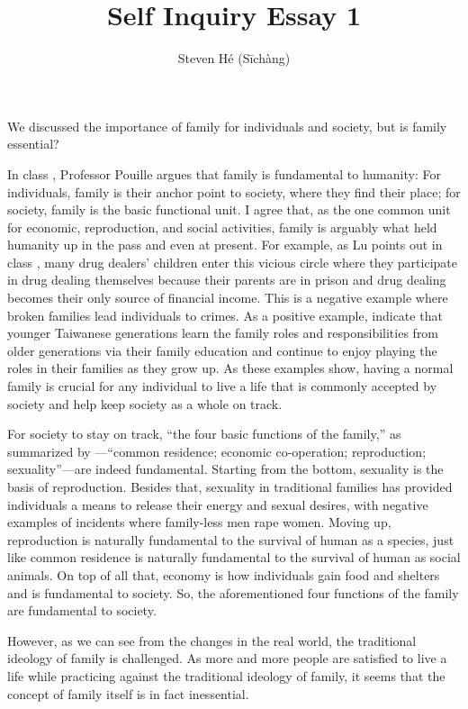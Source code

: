 \documentclass[12pt]{article}
\title{Self Inquiry Essay 1}
\author{Steven Hé (Sīchàng)}
\begin{document}
\maketitle
We discussed the importance of family for individuals and society,
but is family essential?

In class \citep{pouille2023ethics},
Professor Pouille argues that family is fundamental to humanity:
For individuals, family is their anchor point to society,
where they find their place;
for society, family is the basic functional unit.
I agree that, as the one common unit for economic, reproduction, and social
activities, family is arguably what held humanity up in the pass and even at
present.
For example, as Lu points out in class \citep{pouille2023ethics},
many drug dealers' children enter this vicious circle where
they participate in drug dealing themselves because their parents are in prison
and drug dealing becomes their only source of financial income.
This is a negative example where broken families lead individuals to crimes.
As a positive example, \citet{lu1998family} indicate that
younger Taiwanese generations learn the family roles and responsibilities from
older generations via their family education and
continue to enjoy playing the roles in their families as they grow up.
As these examples show, having a normal family is crucial for any individual to
live a life that is commonly accepted by society and help keep society as a
whole on track.

For society to stay on track, ``the four basic functions of the family,''
as summarized by \citet[p. 60]{gittins1993family}—``common residence;
economic co-operation; reproduction; sexuality''—are indeed fundamental.
Starting from the bottom, sexuality is the basis of reproduction.
Besides that, sexuality in traditional families has provided individuals
a means to release their energy and sexual desires,
with negative examples of incidents where family-less men rape women.
Moving up, reproduction is naturally fundamental to the survival of human as
a species, just like common residence is naturally fundamental to the survival
of human as social animals.
On top of all that, economy is how individuals gain food and shelters and
is fundamental to society.
So, the aforementioned four functions of the family are fundamental to society.

However, as we can see from the changes in the real world,
the traditional ideology of family is challenged.
As more and more people are satisfied to live a life while
practicing against the traditional ideology of family,
it seems that the concept of family itself is in fact inessential.
\end{document}
